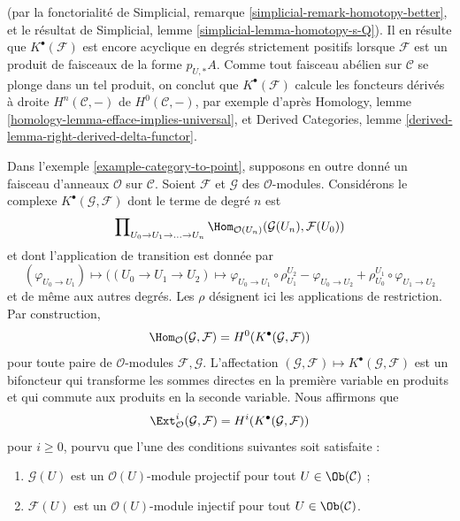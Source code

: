 \begin{example}
(par la fonctorialité de Simplicial, remarque
\ref{simplicial-remark-homotopy-better}, et le résultat de Simplicial, lemme
\ref{simplicial-lemma-homotopy-s-Q}). Il en résulte que
$K^\bullet(\mathcal{F})$ est encore acyclique en degrés strictement positifs
lorsque $\mathcal{F}$ est un produit de faisceaux de la forme $p_{U, *}A$.
Comme tout faisceau abélien sur $\mathcal{C}$ se plonge dans un tel produit,
on conclut que $K^\bullet(\mathcal{F})$ calcule les foncteurs dérivés à droite
$H^n(\mathcal{C}, -)$ de $H^0(\mathcal{C}, -)$, par exemple d'après
Homology, lemme \ref{homology-lemma-efface-implies-universal}, et Derived
Categories, lemme \ref{derived-lemma-right-derived-delta-functor}.
\end{example}

\begin{example}
\label{example-computing-exts}
Dans l'exemple \ref{example-category-to-point}, supposons en outre donné un
faisceau d'anneaux $\mathcal{O}$ sur $\mathcal{C}$. Soient $\mathcal{F}$ et
$\mathcal{G}$ des $\mathcal{O}$-modules. Considérons le complexe
$K^\bullet(\mathcal{G}, \mathcal{F})$ dont le terme de degré $n$ est
$$
\prod\nolimits_{U_0 \to U_1 \to \ldots \to U_n}
\Hom_{\mathcal{O}(U_n)}(\mathcal{G}(U_n), \mathcal{F}(U_0))
$$
et dont l'application de transition est donnée par
$$
(\varphi_{U_0 \to U_1})
\longmapsto
((U_0 \to U_1 \to U_2) \mapsto
\varphi_{U_0 \to U_1} \circ \rho^{U_2}_{U_1}
- \varphi_{U_0 \to U_2}
+ \rho^{U_1}_{U_0} \circ \varphi_{U_1 \to U_2}
$$
et de même aux autres degrés. Les $\rho$ désignent ici les applications de
restriction. Par construction,
$$
\Hom_\mathcal{O}(\mathcal{G}, \mathcal{F}) =
H^0(K^\bullet(\mathcal{G}, \mathcal{F}))
$$
pour toute paire de $\mathcal{O}$-modules $\mathcal{F}, \mathcal{G}$.
L'affectation
$(\mathcal{G}, \mathcal{F}) \mapsto K^\bullet(\mathcal{G}, \mathcal{F})$
est un bifoncteur qui transforme les sommes directes en la première variable
en produits et qui commute aux produits en la seconde variable. Nous
affirmons que
$$
\Ext^i_\mathcal{O}(\mathcal{G}, \mathcal{F}) =
H^i(K^\bullet(\mathcal{G}, \mathcal{F}))
$$
pour $i \geq 0$, pourvu que l'une des conditions suivantes soit satisfaite :
\begin{enumerate}
\item $\mathcal{G}(U)$ est un $\mathcal{O}(U)$-module projectif pour tout
$U \in \Ob(\mathcal{C})$ ;
\item $\mathcal{F}(U)$ est un $\mathcal{O}(U)$-module injectif pour tout
$U \in \Ob(\mathcal{C})$.
\end{enumerate}

\end{example}
